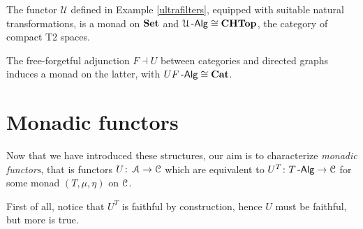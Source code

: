 \documentclass[a4paper,11pt,oneside,openany]{scrbook}
\begin{document}
	\begin{exmp}
		The functor $\mathcal{U}$ defined in Example \ref{ultrafilters}, equipped with suitable natural transformations, is a monad on ${\normalfont\textbf{Set}}$ and $\mathcal{U}\operatorname{-\mathsf{Alg}}\cong {\normalfont\textbf{CHTop}}$, the category of compact T2 spaces.
	\end{exmp}

	\begin{exmp}
		The free-forgetful adjunction $F\dashv U$ between categories and directed graphs induces a monad on the latter, with $UF\operatorname{-\mathsf{Alg}}\cong{\normalfont\textbf{Cat}}$.
	\end{exmp}

	\section{Monadic functors}
	
	Now that we have introduced these structures, our aim is to characterize \emph{monadic functors}, that is functors $U\colon\operatorname{\mathcal{A}}\rightarrow\operatorname{\mathcal{C}}$ which are equivalent to $U^T\colon T\operatorname{-\mathsf{Alg}}\rightarrow\operatorname{\mathcal{C}}$ for some monad $(T,\mu,\eta)$ on $\operatorname{\mathcal{C}}$.

	First of all, notice that $U^T$ is faithful by construction, hence $U$ must be faithful, but more is true.
	
\end{document}
